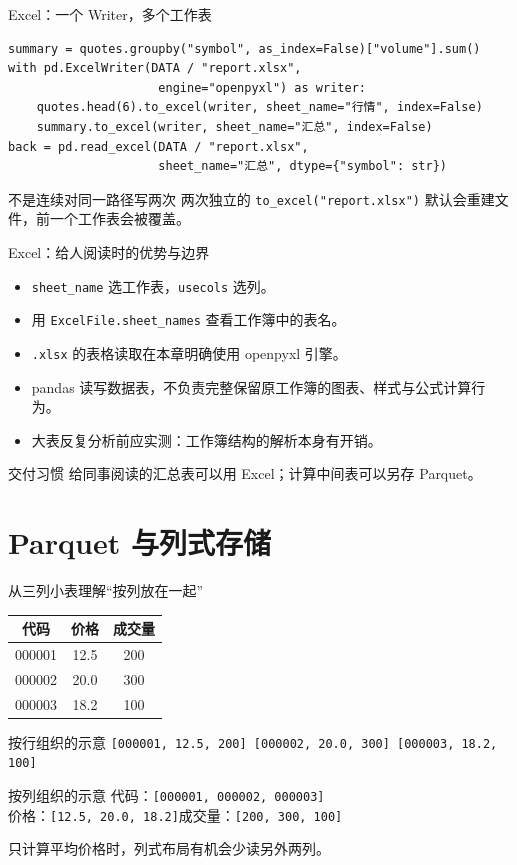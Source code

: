 \documentclass[9pt]{ctexbeamer}
\begin{document}
\begin{frame}[fragile]{Excel：一个 Writer，多个工作表}
\begin{lstlisting}
summary = quotes.groupby("symbol", as_index=False)["volume"].sum()
with pd.ExcelWriter(DATA / "report.xlsx",
                     engine="openpyxl") as writer:
    quotes.head(6).to_excel(writer, sheet_name="行情", index=False)
    summary.to_excel(writer, sheet_name="汇总", index=False)
back = pd.read_excel(DATA / "report.xlsx",
                     sheet_name="汇总", dtype={"symbol": str})
\end{lstlisting}
\begin{alertblock}{不是连续对同一路径写两次}
两次独立的 \texttt{to\_excel("report.xlsx")} 默认会重建文件，前一个工作表会被覆盖。
\end{alertblock}
\end{frame}

\begin{frame}{Excel：给人阅读时的优势与边界}
\begin{itemize}
\item \texttt{sheet\_name} 选工作表，\texttt{usecols} 选列。
\item 用 \texttt{ExcelFile.sheet\_names} 查看工作簿中的表名。
\item \texttt{.xlsx} 的表格读取在本章明确使用 openpyxl 引擎。
\item pandas 读写数据表，不负责完整保留原工作簿的图表、样式与公式计算行为。
\item 大表反复分析前应实测：工作簿结构的解析本身有开销。
\end{itemize}
\begin{block}{交付习惯}
给同事阅读的汇总表可以用 Excel；计算中间表可以另存 Parquet。
\end{block}
\end{frame}

\section{Parquet 与列式存储}

\begin{frame}{从三列小表理解“按列放在一起”}
\begin{center}
\begin{tabular}{ccc}
\toprule
代码 & 价格 & 成交量 \\
\midrule
000001 & 12.5 & 200 \\
000002 & 20.0 & 300 \\
000003 & 18.2 & 100 \\
\bottomrule
\end{tabular}
\end{center}
\begin{block}{按行组织的示意}
\texttt{[000001, 12.5, 200] [000002, 20.0, 300] [000003, 18.2, 100]}
\end{block}
\begin{exampleblock}{按列组织的示意}
代码：\texttt{[000001, 000002, 000003]}\\
价格：\texttt{[12.5, 20.0, 18.2]}\quad 成交量：\texttt{[200, 300, 100]}
\end{exampleblock}
只计算平均价格时，列式布局有机会少读另外两列。
\end{frame}
\end{document}
